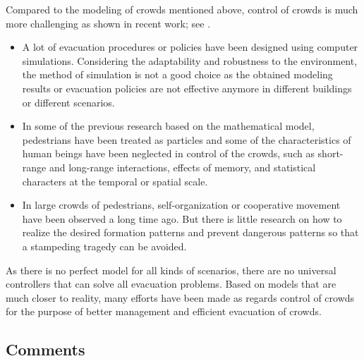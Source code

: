 \documentclass[]{chencao}
\begin{document}
Compared to the modeling of crowds mentioned above, control of crowds
is much more challenging as shown in recent work; see
\cite{1.DirkHelbing2005,1.Bellomo2011a,1.Cristiani2011,
1.ChristianDogbe2012,1.Bogdan2011a,1.DanielStuart2013}.
%
\begin{itemize}
\item
A lot of evacuation procedures or policies have been designed using
computer simulations. Considering the adaptability and robustness to the
environment, the method of simulation is not a good choice as the
obtained modeling results or evacuation policies are not effective
anymore in different buildings or different scenarios.
\item
In some of the previous research based on the mathematical model,
pedestrians have been treated as particles and some of the
characteristics of human beings have been neglected in control of the
crowds, such as short-range and long-range interactions, effects of
memory, and statistical characters at the temporal or spatial scale.
\item
In large crowds of pedestrians, self-organization or cooperative
movement have been observed a long time ago. But there is little
research on how to realize the desired formation patterns and prevent
dangerous patterns so that a stampeding tragedy can be avoided.
\end{itemize}
As there is no perfect model for all kinds of scenarios, there are no
universal controllers that can solve all evacuation problems. Based on
models that are much closer to reality, many efforts have been made as
regards control of crowds for the purpose of better management and
efficient evacuation of crowds.

\subsection{Comments}
\end{document}
